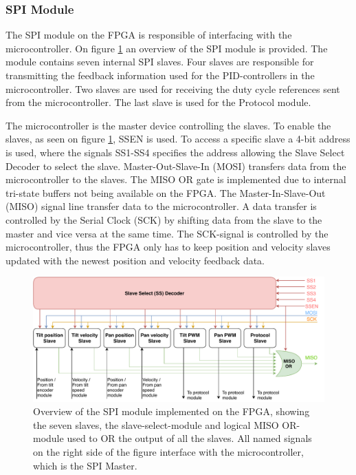 \documentclass[../../main.tex]{subfiles}
\begin{document}
\subsubsection*{SPI Module}

The SPI module on the FPGA is responsible of interfacing with the microcontroller. On figure \ref{fig:SPILogicSimple} an overview of the SPI module is provided. The module contains seven internal SPI slaves. Four slaves are responsible for transmitting the feedback information used for the PID-controllers in the microcontroller. Two slaves are used for receiving the duty cycle references sent from the microcontroller. The last slave is used for the Protocol module.

The microcontroller is the master device controlling the slaves. To enable the slaves, as seen on figure \ref{fig:SPILogicSimple}, SSEN is used. To access a specific slave a 4-bit address is used, where the signals SS1-SS4 specifies the address allowing the Slave Select Decoder to select the slave. Master-Out-Slave-In (MOSI) transfers data from the microcontroller to the slaves. The MISO OR gate is implemented due to internal tri-state buffers not being available on the FPGA. The Master-In-Slave-Out (MISO) signal line transfer data to the microcontroller. A data transfer is controlled by the Serial Clock (SCK) by shifting data from the slave to the master and vice versa at the same time. The SCK-signal is controlled by the microcontroller, thus the FPGA only has to keep position and velocity slaves updated with the newest position and velocity feedback data. 

\begin{figure}[]
    \centering
    \includegraphics[width=\textwidth]{Sections/System_Implementation/Images/SPILogicSimple.pdf}
    \caption{Overview of the SPI module implemented on the FPGA, showing the seven slaves, the slave-select-module and logical MISO OR-module used to OR the output of all the slaves. All named signals on the right side of the figure interface with the microcontroller, which is the SPI Master. } %
    \label{fig:SPILogicSimple}
\end{figure}
\end{document}
